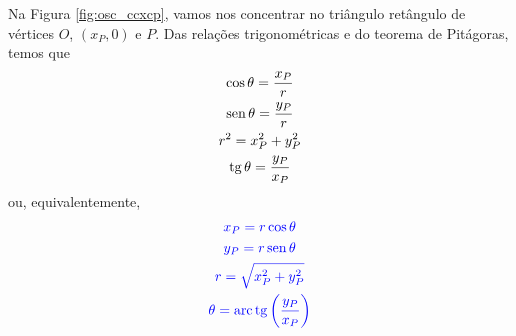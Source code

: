 Na Figura \ref{fig:osc_ccxcp}, vamos nos concentrar no triângulo retângulo de vértices $O$, $(x_P, 0)$ e $P$. Das relações trigonométricas e do teorema de Pitágoras, temos que
\begin{gather}
  \cos\theta = \frac{x_P}{r} \\
  \operatorname{sen}\theta = \frac{y_P}{r} \\
  r^2 = x_P^2 + y_P^2 \\
  \operatorname{tg}\theta = \frac{y_P}{x_P}
\end{gather}
ou, equivalentemente,
\begin{gather}
  {\color{blue}x_P = r\cos\theta} \\
  {\color{blue}y_P = r\operatorname{sen}\theta} \\
  {\color{blue}r = \sqrt{x_P^2 + y_P^2 }} \\
  {\color{blue}\theta = \operatorname{arc}\operatorname{tg}\left(\frac{y_P}{x_P}\right)}
\end{gather}

